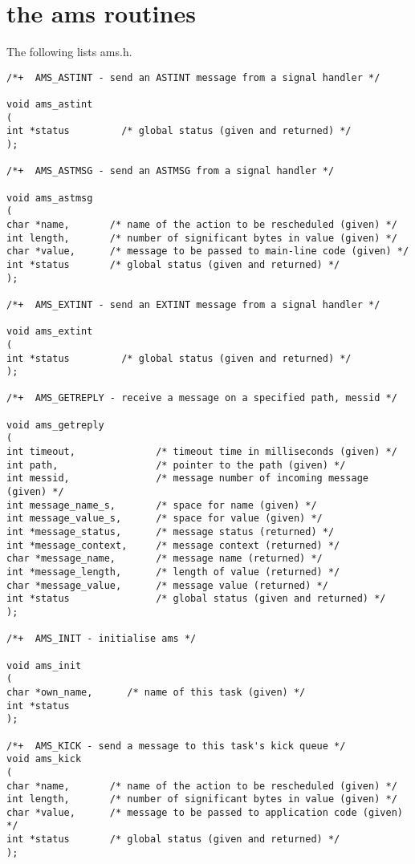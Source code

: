\section {the ams routines}

The following lists ams.h.


\begin{verbatim}
/*+  AMS_ASTINT - send an ASTINT message from a signal handler */

void ams_astint
(
int *status         /* global status (given and returned) */
);

/*+  AMS_ASTMSG - send an ASTMSG from a signal handler */

void ams_astmsg
(
char *name,       /* name of the action to be rescheduled (given) */
int length,       /* number of significant bytes in value (given) */
char *value,      /* message to be passed to main-line code (given) */
int *status       /* global status (given and returned) */
);

/*+  AMS_EXTINT - send an EXTINT message from a signal handler */

void ams_extint
(
int *status         /* global status (given and returned) */
);

/*+  AMS_GETREPLY - receive a message on a specified path, messid */

void ams_getreply
(
int timeout,              /* timeout time in milliseconds (given) */
int path,                 /* pointer to the path (given) */
int messid,               /* message number of incoming message (given) */
int message_name_s,       /* space for name (given) */
int message_value_s,      /* space for value (given) */
int *message_status,      /* message status (returned) */
int *message_context,     /* message context (returned) */
char *message_name,       /* message name (returned) */
int *message_length,      /* length of value (returned) */
char *message_value,      /* message value (returned) */
int *status               /* global status (given and returned) */
);

/*+  AMS_INIT - initialise ams */

void ams_init
(
char *own_name,      /* name of this task (given) */
int *status
);

/*+  AMS_KICK - send a message to this task's kick queue */
void ams_kick 
(
char *name,       /* name of the action to be rescheduled (given) */
int length,       /* number of significant bytes in value (given) */
char *value,      /* message to be passed to application code (given) */
int *status       /* global status (given and returned) */
);


\end{verbatim}
